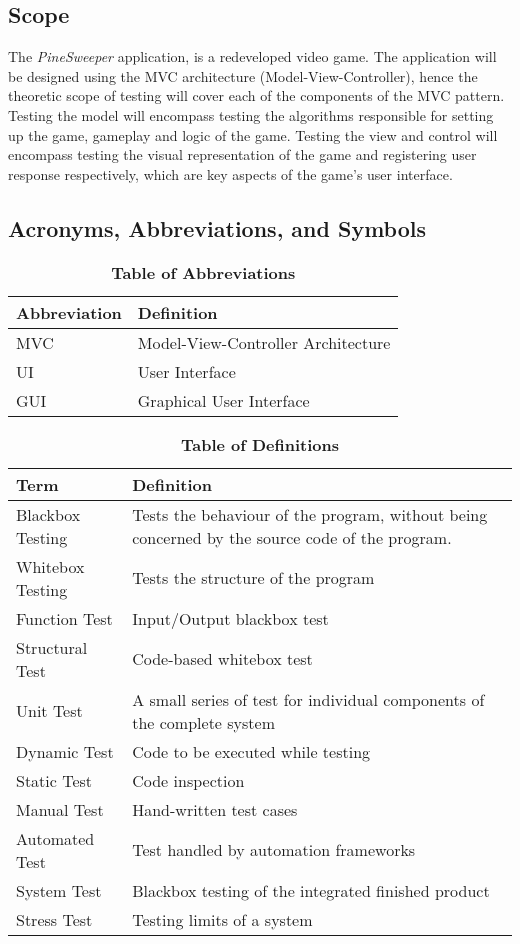 \documentclass[12pt, titlepage]{article}
\begin{document}
\subsection{Scope}
The \textit{PineSweeper} application, is a redeveloped video game. The application will be designed using the MVC architecture
(Model-View-Controller), hence the theoretic scope of testing will cover each of the components of the MVC pattern. Testing the model
will encompass testing the algorithms responsible for setting up the game, gameplay and logic of the game. Testing the view and control
will encompass testing the visual representation of the game and registering user response respectively, which are key aspects of the
game's user interface. 

\subsection{Acronyms, Abbreviations, and Symbols}
\begin{table}[hbp]
\caption{\textbf{Table of Abbreviations}} \label{Table}
\begin{tabularx}{\textwidth}{p{3.5cm}X}
\toprule
\textbf{Abbreviation} & \textbf{Definition} \\
\midrule
	MVC & Model-View-Controller Architecture \\
	UI & User Interface \\
	GUI & Graphical User Interface \\
\bottomrule
\end{tabularx}
\end{table}

\begin{table}[!htbp]
\caption{\textbf{Table of Definitions}} \label{Table}
\begin{tabularx}{\textwidth}{p{3.5cm}X}
\toprule
\textbf{Term} & \textbf{Definition}\\
\midrule
	Blackbox Testing & Tests the behaviour of the program, without being concerned by the source code of the program. \\
	Whitebox Testing & Tests the structure of the program \\
	Function Test & Input/Output blackbox test \\
	Structural Test & Code-based whitebox test \\
	Unit Test & A small series of test for individual components of the complete system \\
	Dynamic Test & Code to be executed while testing \\
	Static Test & Code inspection \\
	Manual Test & Hand-written test cases \\
	Automated Test & Test handled by automation frameworks \\
	System Test & Blackbox testing of the integrated finished product \\
	Stress Test & Testing limits of a system \\
\bottomrule
\end{tabularx}
\end{table}
\end{document}
